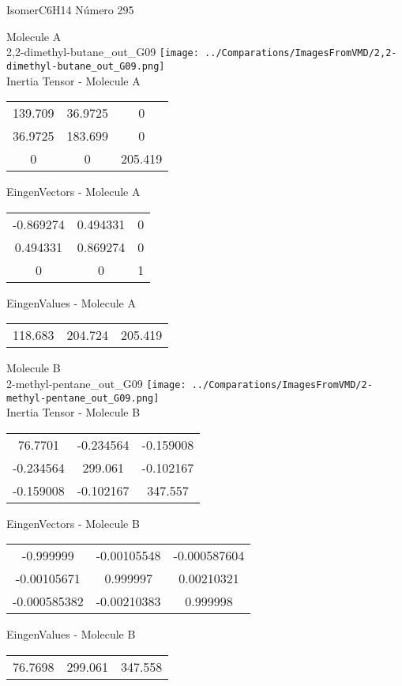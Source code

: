 \vtab[-2cm]
\begin{center}
{\large IsomerC6H14 \tab Número 295}
\end{center}
\begin{multicols}{2}
\begin{center}

Molecule A \\ 
2,2-dimethyl-butane\_out\_G09
\texttt{[image: ../Comparations/ImagesFromVMD/2,2-dimethyl-butane\_out\_G09.png]}
\\
Inertia Tensor - Molecule A \\
\vtab

\begin{tabular}{|c c c|}
139.709	 & 	36.9725	 & 	0	 \\
36.9725	 & 	183.699	 & 	0	 \\
0	 & 	0	 & 	205.419
\end{tabular}

\vtab
 EingenVectors - Molecule A     \\
\vtab
\begin{tabular}{|c c c|}
-0.869274	 & 	0.494331	 & 	0	 \\
0.494331	 & 	0.869274	 & 	0	 \\
0	 & 	0	 & 	1
\end{tabular}

\vtab
 EingenValues - Molecule A     \\
\vtab
\begin{tabular}{|c c c|}
118.683	 & 	204.724	 & 	205.419	 \\
\end{tabular}
\columnbreak

Molecule B \\ 
2-methyl-pentane\_out\_G09
\texttt{[image: ../Comparations/ImagesFromVMD/2-methyl-pentane\_out\_G09.png]}
\\
Inertia Tensor - Molecule B \\
\vtab

\begin{tabular}{|c c c|}
76.7701	 & 	-0.234564	 & 	-0.159008	 \\
-0.234564	 & 	299.061	 & 	-0.102167	 \\
-0.159008	 & 	-0.102167	 & 	347.557
\end{tabular}

\vtab
 EingenVectors - Molecule B     \\
\vtab
\begin{tabular}{|c c c|}
-0.999999	 & 	-0.00105548	 & 	-0.000587604	 \\
-0.00105671	 & 	0.999997	 & 	0.00210321	 \\
-0.000585382	 & 	-0.00210383	 & 	0.999998
\end{tabular}

\vtab
 EingenValues - Molecule B     \\
\vtab
\begin{tabular}{|c c c|}
76.7698	 & 	299.061	 & 	347.558	 \\
\end{tabular}

\end{center}
\end{multicols}
